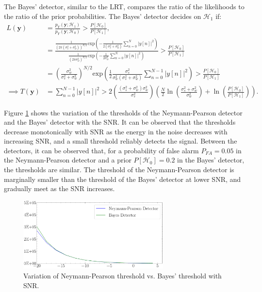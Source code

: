 \documentclass[11pt]{article}
\newcommand{\by}{\mathbf{y}}
\newcommand{\cH}{\mathcal{H}}
\begin{document}
\noindent {} The Bayes' detector, similar to the LRT, compares the ratio of the likelihoods to the ratio of the prior probabilities. The Bayes' detector decides on $\cH_{1}$ if:
\begin{equation}
\begin{split}
L(\by) &= \frac{p_{Y}(\by ; \cH_{1})}{p_{Y}(\by ; \cH_{0})} > \frac{P[\cH_{0}]}{P[\cH_{1}]}, \\
&= \frac{\frac{1}{(2\pi(\sigma_{s}^{2} + \sigma_{w}^{2}))^{N/2}} \mathrm{exp}\left(-\frac{1}{2(\sigma_{s}^{2}+\sigma_{w}^{2})} \sum_{n=0}^{N}\vert y[n] \vert^{2} \right)}{\frac{1}{(2\pi\sigma_{w}^{2})^{N/2}} \mathrm{exp}\left(-\frac{1}{2\sigma_{w}^{2}} \sum_{n=0}^{N}\vert y[n] \vert^{2} \right)} > \frac{P[\cH_{0}]}{P[\cH_{1}]} \\
&= \left(\frac{\sigma_{w}^{2}}{\sigma_{s}^{2}+\sigma_{w}^{2}}\right)^{N/2} \mathrm{exp} \left( \frac{1}{2} \frac{\sigma_{s}^{2}}{\sigma_{w}^{2}(\sigma_{s}^{2}+\sigma_{w}^{2})} \sum_{n=0}^{N-1} \vert y[n] \vert^{2} \right) > \frac{P[\cH_{0}]}{P[\cH_{1}]} \\
\implies T(\by) &= \sum_{n=0}^{N-1} \vert y[n] \vert^{2} > 2\left( \frac{(\sigma_{s}^{2}+\sigma_{w}^{2})\sigma_{w}^{2}}{\sigma_{s}^{2}} \right) \left( \frac{N}{2} \ln\left( \frac{\sigma_{s}^{2}+\sigma_{w}^{2}}{\sigma_{w}^{2}} \right) + \ln\left( \frac{P[\cH_{0}]}{P[\cH_{1}]} \right)\right).
\end{split}
\label{eq:energyBayes}
\end{equation}

Figure \ref{fig:thresholds} shows the variation of the thresholds of the Neymann-Pearson detector and the Bayes' detector with the SNR. It can be observed that the thresholds decrease monotonically with SNR as the energy in the noise decreases with increasing SNR, and a small threshold reliably detects the signal. Between the detectors, it can be observed that, for a probability of false alarm $P_{FA} = 0.05$ in the Neymann-Pearson detector and a prior $P[\cH_{0}] = 0.2$ in the Bayes' detector, the thresholds are similar. The threshold of the Neymann-Pearson detector is marginally smaller than the threshold of the Bayes' detector at lower SNR, and gradually meet as the SNR increases.
\begin{figure}[b]
\centering
	\includegraphics[width=3in]{../results/thresholds}
\caption{Variation of Neymann-Pearson threshold vs. Bayes' threshold with SNR.}
\label{fig:thresholds}
\end{figure}
\end{document}
